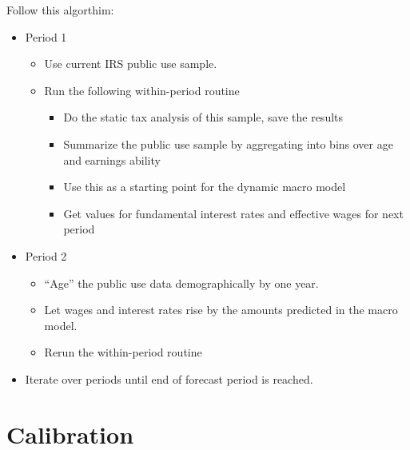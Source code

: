 \documentclass[letterpaper,12pt]{article}
\theoremstyle{definition}
\numberwithin{equation}{section}
\begin{document}
\begin{spacing}{1.5}
  Follow this algorthim:
  \begin{itemize}
    \item Period 1
    \begin{itemize}
      \item Use current IRS public use sample.
      \item Run the following within-period routine
      \begin{itemize}
        \item Do the static tax analysis of this sample, save the results
        \item Summarize the public use sample by aggregating into bins over age and earnings ability
        \item Use this as a starting point for the dynamic macro model
        \item Get values for fundamental interest rates and effective wages for next period
      \end{itemize}
    \end{itemize}
  \item Period 2
    \begin{itemize}
      \item “Age” the public use data demographically by one year.
      \item Let wages and interest rates rise by the amounts predicted in the macro model.
      \item Rerun the within-period routine
    \end{itemize}
  \item Iterate over periods until end of forecast period is reached.
  \end{itemize}

\section{Calibration}

\end{spacing}
\end{document}
